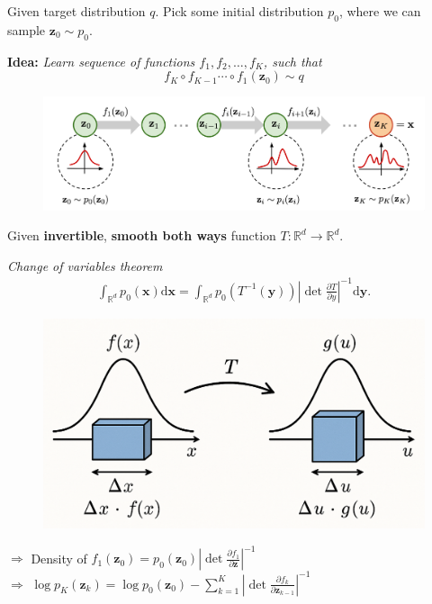 \documentclass{beamer}
\begin{document}
\begin{frame}
    Given target distribution \( q \). Pick some initial distribution \( p_{0} \), where we can sample \( \mathbf{z}_0 \sim p_{0} \).
    \vskip 5pt
    \begin{blackblock}
\textbf{Idea:} \emph{Learn sequence of functions \( f_{1}, f_{2}, \ldots, f_{K} \), such that} \[ f_{K} \circ f_{K - 1} \cdots \circ f_{1}(\mathbf{z}_0) \sim q \]
    \end{blackblock}
    \begin{figure}
        \centering
        \includegraphics[width=1.0\linewidth]{figures/normalizing-flow.png}
    \end{figure}
\end{frame}
\begin{frame}
    Given \textbf{invertible}, \textbf{smooth both ways} function \( T : \mathbb{R}^d \to \mathbb{R}^d \).
    \begin{blackblock}
    \emph{Change of variables theorem}
    \begin{align*}
        \int_{\mathbb{R}^d} p_{0}(\mathbf{x}) \mathrm{d}\mathbf{x} = \int_{\mathbb{R}^d} p_0(T^{-1}(\mathbf{y})) \left| \det \frac{\partial T}{\partial y} \right|^{-1}  \mathrm{d} \mathbf{y}
    .\end{align*}
    \end{blackblock}
    \begin{figure}
        \includegraphics[width=0.5\linewidth]{figures/COVT.png}
    \end{figure}
    \( \Rightarrow \) Density of \( f_{1}(\mathbf{z}_0) = p_{0}(\mathbf{z}_0) \left| \det \frac{\partial f_{1}}{\partial \mathbf{z}} \right|^{-1}  \) \\
    \( \Rightarrow \) \( \log p_K(\mathbf{z}_k) = \log p_{0}(\mathbf{z}_0) - \sum_{k = 1}^{K} \left| \det \frac{\partial f_{k}}{\partial \mathbf{z}_{k - 1}} \right|^{-1}  \)
\end{frame}
\end{document}
